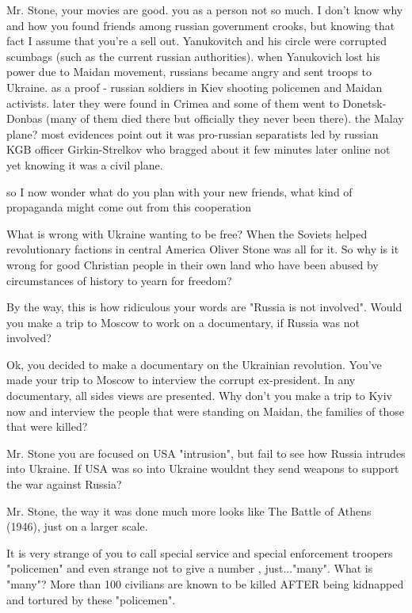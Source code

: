 \begin{itemize}
Mr. Stone, your movies are good. you as a person not so much. I don't know why
and how you found friends among russian government crooks, but knowing that
fact I assume that you're a sell out. Yanukovitch and his circle were corrupted
scumbags (such as the current russian authorities). when Yanukovich lost his
power due to Maidan movement, russians became angry and sent troops to Ukraine.
as a proof - russian soldiers in Kiev shooting policemen and Maidan activists.
later they were found in Crimea and some of them went to Donetsk-Donbas (many
of them died there but officially they never been there). the Malay plane? most
evidences point out it was pro-russian separatists led by russian KGB officer
Girkin-Strelkov who bragged about it few minutes later online not yet knowing
it was a civil plane.

so I now wonder what do you plan with your new friends, what kind of propaganda
might come out from this cooperation


What is wrong with Ukraine wanting to be free? When the Soviets helped
revolutionary factions in central America Oliver Stone was all for it. So why
is it wrong for good Christian people in their own land who have been abused by
circumstances of history to yearn for freedom?


By the way, this is how ridiculous your words are "Russia is not involved".
Would you make a trip to Moscow to work on a documentary, if Russia was not
involved?


Ok, you decided to make a documentary on the Ukrainian revolution. You've made
your trip to Moscow to interview the corrupt ex-president. In any documentary,
all sides views are presented. Why don't you make a trip to Kyiv now and
interview the people that were standing on Maidan, the families of those that
were killed?


Mr. Stone you are focused on USA "intrusion", but fail to see how Russia
intrudes into Ukraine. If USA was so into Ukraine wouldnt they send weapons to
support the war against Russia?


Mr. Stone, the way it was done much more looks like The Battle of Athens
(1946), just on a larger scale.

It is very strange of you to call special service and special enforcement
troopers "policemen" and even strange not to give a number , just..."many".
What is "many"? More than 100 civilians are known to be killed AFTER being
kidnapped and tortured by these "policemen".


\end{itemize}
